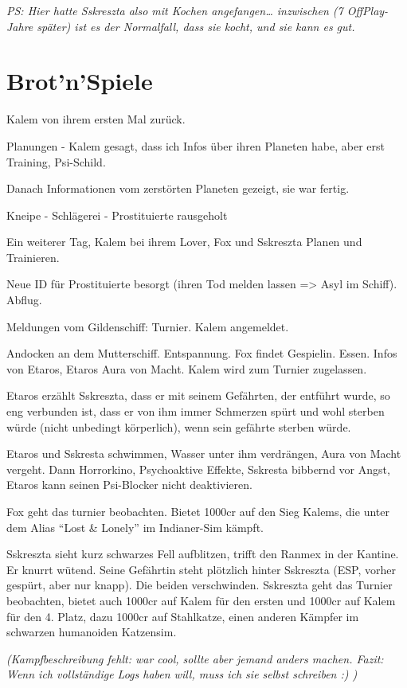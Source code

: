 \documentclass[11pt]{article}
\begin{document}
\emph{PS: Hier hatte Sskreszta also mit Kochen angefangen\ldots{}
inzwischen (7 OffPlay-Jahre später) ist es der Normalfall, dass sie
kocht, und sie kann es gut.}

\section{Brot'n'Spiele}

Kalem von ihrem ersten Mal zurück.

Planungen - Kalem gesagt, dass ich Infos über ihren Planeten habe, aber
erst Training, Psi-Schild.

Danach Informationen vom zerstörten Planeten gezeigt, sie war fertig.

Kneipe - Schlägerei - Prostituierte rausgeholt

Ein weiterer Tag, Kalem bei ihrem Lover, Fox und Sskreszta Planen und
Trainieren.

Neue ID für Prostituierte besorgt (ihren Tod melden lassen
=\textgreater{} Asyl im Schiff). Abflug.

Meldungen vom Gildenschiff: Turnier. Kalem angemeldet.

Andocken an dem Mutterschiff. Entspannung. Fox findet Gespielin. Essen.
Infos von Etaros, Etaros Aura von Macht. Kalem wird zum Turnier
zugelassen.

Etaros erzählt Sskreszta, dass er mit seinem Gefährten, der entführt
wurde, so eng verbunden ist, dass er von ihm immer Schmerzen spürt und
wohl sterben würde (nicht unbedingt körperlich), wenn sein gefährte
sterben würde.

Etaros und Sskresta schwimmen, Wasser unter ihm verdrängen, Aura von
Macht vergeht. Dann Horrorkino, Psychoaktive Effekte, Sskresta bibbernd
vor Angst, Etaros kann seinen Psi-Blocker nicht deaktivieren.

Fox geht das turnier beobachten. Bietet 1000cr auf den Sieg Kalems, die
unter dem Alias ``Lost \& Lonely'' im Indianer-Sim kämpft.

Sskreszta sieht kurz schwarzes Fell aufblitzen, trifft den Ranmex in der
Kantine. Er knurrt wütend. Seine Gefährtin steht plötzlich hinter
Sskreszta (ESP, vorher gespürt, aber nur knapp). Die beiden
verschwinden. Sskreszta geht das Turnier beobachten, bietet auch 1000cr
auf Kalem für den ersten und 1000cr auf Kalem für den 4. Platz, dazu
1000cr auf Stahlkatze, einen anderen Kämpfer im schwarzen humanoiden
Katzensim.

\emph{(Kampfbeschreibung fehlt: war cool, sollte aber jemand anders
machen. Fazit: Wenn ich vollständige Logs haben will, muss ich sie
selbst schreiben :) )}
\end{document}
